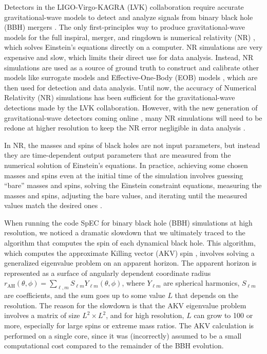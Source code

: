 \documentclass{iopjournal}
\begin{document}
Detectors in the LIGO-Virgo-KAGRA (LVK) \cite{sxs25_5,sxs25_6} collaboration require accurate gravitational-wave models to detect and analyze signals from binary black hole (BBH) mergers \cite{GWTC4.0,sxs25_2,sxs25_1,sxs25_3,sxs25_4}. The only first-principles way to produce gravitational-wave models for the full inspiral, merger, and ringdown is numerical relativity (NR) \cite{NR_Baumgarte,NR_shibata,NR_Alcubierre}, which solves Einstein’s equations directly on a computer. NR simulations are very expensive and slow, which limits their direct use for data analysis. Instead, NR simulations are used as a source of ground truth to construct and calibrate other models like surrogate models \cite{sxs25_68,sxs25_71,sxs25_72,sxs25_69,sxs25_70} and Effective-One-Body (EOB) models \cite{sxs25_43,sxs25_44,sxs25_45,sxs25_46,sxs25_49,sxs25_50}, which are then used for detection and data analysis. Until now, the accuracy of Numerical Relativity (NR) simulations has been sufficient for the gravitational-wave detections made by the LVK collaboration. However, with the new generation of gravitational-wave detectors coming online \cite{sxs25_74,sxs25_77,sxs25_78}, many NR simulations will need to be redone at higher resolution to keep the NR error negligible in data analysis \cite{sxs25_83}.

In NR, the masses and spins of black holes are not input
parameters, but instead they are time-dependent output parameters
that are measured from the numerical solution of Einstein's
equations. In practice, achieving some chosen masses and spins even
at the initial time of the simulation involves guessing ``bare''
masses and spins, solving the Einstein constraint equations,
measuring the masses and spins, adjusting the bare values, and
iterating until the measured values match the desired
ones \cite{sxs25_143}.

When running the code SpEC \cite{SpECwebsite} for binary black hole
(BBH) simulations at high resolution, we noticed a dramatic
slowdown that we ultimately traced to the algorithm that computes
the spin of each dynamical black hole. This algorithm, which
computes the approximate Killing vector (AKV) spin \cite{lovelace_binary-black-hole_2008, Owen:2017yaj}, involves solving a
generalized eigenvalue problem on an apparent horizon.  The apparent
horizon is represented as a surface of angularly dependent
coordinate radius $r_{\mathrm{AH}}(\theta,\phi)=\sum_{\ell,m} S_{\ell m}
Y_{\ell m}(\theta,\phi)$, where $Y_{\ell m}$ are spherical harmonics,
$S_{\ell m}$ are coefficients,
and the sum goes up to some value $L$ that depends on the
resolution.  The reason for the slowdown is that the AKV eigenvalue
problem involves a matrix of size $L^2 \times L^2$, and
for high resolution, $L$ can grow to 100 or more, especially for
large spins or extreme mass ratios.  The AKV calculation is performed on a single core, since it was (incorrectly) assumed to be a
small computational cost compared to the remainder of the BBH
evolution.
\end{document}

